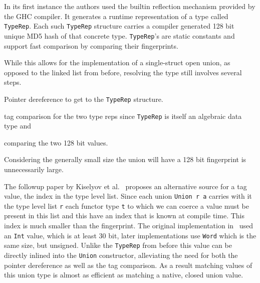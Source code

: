 In its first instance the authors used the builtin reflection
mechanism provided by the GHC compiler\cite{ghc}. It generates a runtime
representation of a type called \texttt{TypeRep}. Each such \texttt{TypeRep}
structure carries a compiler generated 128 bit unique MD5 hash of that concrete
type. \texttt{TypeRep}'s are static constants and support fast comparison by
comparing their fingerprints.

While this allows for the implementation of a single-struct open union, as
opposed to the linked list from before, resolving the type still involves
several steps.
\begin{enumerate*}
\item Pointer dereference to get to the \texttt{TypeRep} structure.
\item tag comparison for the two type reps since \texttt{TypeRep} is itself an
  algebraic data type and
\item comparing the two 128 bit values.
\end{enumerate*}
Considering the generally small size the union will have a 128 bit fingerprint
is unnecessarily large.

The followup paper by Kiselyov et al.~\cite{freer} proposes an alternative
source for a tag value, the index in the type level list. Since each union
\texttt{Union r a} carries with it the type level list \texttt{r} each functor
type \texttt{t} to which we can coerce a value must be present in this list and
this have an index that is known at compile time. This index is much smaller
than the fingerprint. The original implementation in~\cite{freer} used an
\texttt{Int} value, which is at least 30 bit, later implementations use
\texttt{Word} which is the same size, but unsigned. Unlike the \texttt{TypeRep}
from before this value can be directly inlined into the \texttt{Union}
constructor, alleviating the need for both the pointer dereference as well as
the tag comparison. As a result matching values of this union type is almost as
efficient as matching a native, closed union value.
